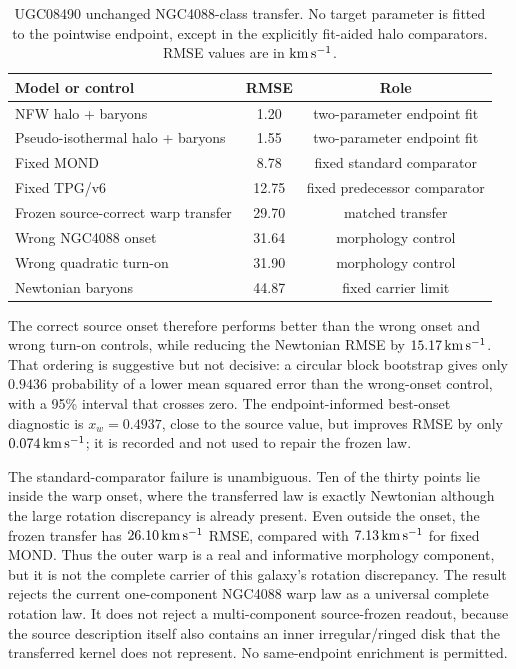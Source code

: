 \documentclass[11pt]{article}
\begin{document}
\begin{table}[H]
\centering
\caption{UGC08490 unchanged NGC4088-class transfer.  No target parameter is
fitted to the pointwise endpoint, except in the explicitly fit-aided halo
comparators.  RMSE values are in \({\rm km\,s^{-1}}\).}
\small
\begin{tabular}{lcc}
\toprule
Model or control & RMSE & Role\\
\midrule
NFW halo + baryons & 1.20 & two-parameter endpoint fit\\
Pseudo-isothermal halo + baryons & 1.55 & two-parameter endpoint fit\\
Fixed MOND & 8.78 & fixed standard comparator\\
Fixed TPG/v6 & 12.75 & fixed predecessor comparator\\
Frozen source-correct warp transfer & 29.70 & matched transfer\\
Wrong NGC4088 onset & 31.64 & morphology control\\
Wrong quadratic turn-on & 31.90 & morphology control\\
Newtonian baryons & 44.87 & fixed carrier limit\\
\bottomrule
\end{tabular}
\end{table}

The correct source onset therefore performs better than the wrong onset and
wrong turn-on controls, while reducing the Newtonian RMSE by
\(15.17\,{\rm km\,s^{-1}}\).  That ordering is suggestive but not decisive: a
circular block bootstrap gives only \(0.9436\) probability of a lower mean
squared error than the wrong-onset control, with a 95\% interval that crosses
zero.  The endpoint-informed best-onset diagnostic is \(x_w=0.4937\), close to
the source value, but improves RMSE by only \(0.074\,{\rm km\,s^{-1}}\); it is
recorded and not used to repair the frozen law.

The standard-comparator failure is unambiguous.  Ten of the thirty points lie
inside the warp onset, where the transferred law is exactly Newtonian although
the large rotation discrepancy is already present.  Even outside the onset,
the frozen transfer has \(26.10\,{\rm km\,s^{-1}}\) RMSE, compared with
\(7.13\,{\rm km\,s^{-1}}\) for fixed MOND.  Thus the outer warp is a real and
informative morphology component, but it is not the complete carrier of this
galaxy's rotation discrepancy.  The result rejects the current one-component
NGC4088 warp law as a universal complete rotation law.  It does not reject a
multi-component source-frozen readout, because the source description itself
also contains an inner irregular/ringed disk that the transferred kernel does
not represent.  No same-endpoint enrichment is permitted.
\end{document}
